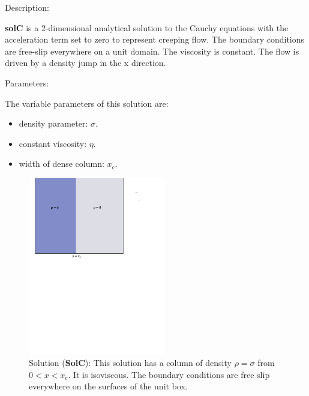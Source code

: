   {\large \fontB Description:}
  
  {\bf solC} is a 2-dimensional analytical solution to the Cauchy equations with the acceleration term set to zero
  to represent creeping flow. The boundary conditions are free-slip everywhere on a unit domain. The viscosity is constant.
  The flow is driven by a density jump in the x direction.

 {\large \fontB Parameters:}
  
 The variable parameters of this solution are:
 \begin{itemize}
   \item{density parameter: $ \sigma $.}
   \item{constant viscosity: $\eta$.}
   \item{width of dense column: $x_c$.}
 \end{itemize}

  \begin{figure}
    \includegraphics[width=6cm,clip]{../figs/figC.pdf}
    \caption[Short caption]{\label{figC} 
      Solution ({\bf SolC}):
      This solution has a column of density $\rho = \sigma$ from $0 < x < x_c$.
      It is isoviscous.
      The boundary conditions are free slip everywhere on the surfaces of the unit box.}
  \end{figure} 
  

